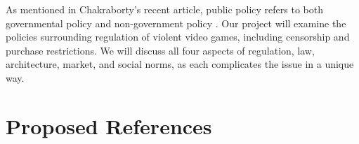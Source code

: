 \documentclass[12pt]{article}
\begin{document}
As mentioned in Chakraborty's recent article, public policy refers to both governmental policy and non-government policy \cite{chakraborty2015}. Our project will examine the policies surrounding regulation of violent video games, including censorship and purchase restrictions. We will discuss all four aspects of regulation, law, architecture, market, and social norms, as each complicates the issue in a unique way.
\section*{Proposed References}
\nocite{*}

\end{document}
